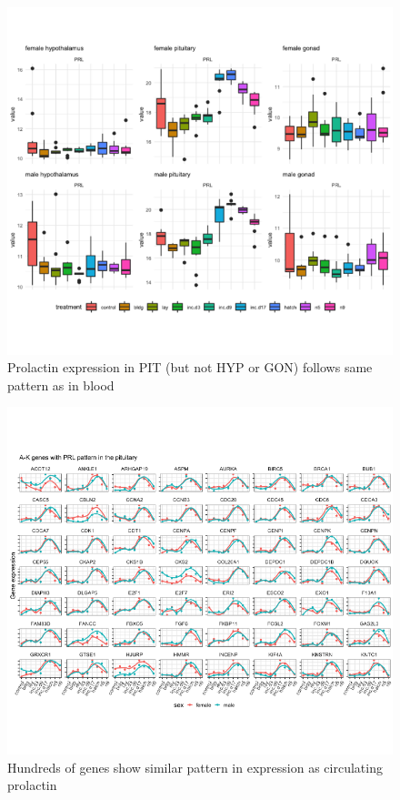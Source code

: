 \documentclass[10pt,letterpaper]{article}
\begin{document}
\begin{figure}
\centering
\includegraphics{characterization_manuscript_files/figure-latex/unnamed-chunk-6-1.pdf}
\caption{Prolactin expression in PIT (but not HYP or GON) follows same
pattern as in blood}
\end{figure}

\begin{figure}
\centering
\includegraphics{characterization_manuscript_files/figure-latex/unnamed-chunk-7-1.pdf}
\caption{Hundreds of genes show similar pattern in expression as
circulating prolactin}
\end{figure}
\end{document}
